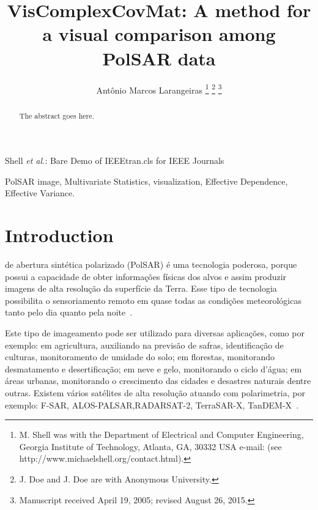 \documentclass[journal]{IEEEtran}
\begin{document}
\title{VisComplexCovMat: A method for a visual comparison among Pol{SAR} data}


\author{Ant\^onio Marcos Larangeiras
        \thanks{M. Shell was with the Department
of Electrical and Computer Engineering, Georgia Institute of Technology, Atlanta,
GA, 30332 USA e-mail: (see http://www.michaelshell.org/contact.html).}%
\thanks{J. Doe and J. Doe are with Anonymous University.}%
\thanks{Manuscript received April 19, 2005; revised August 26, 2015.}}


%
{Shell \MakeLowercase{\textit{et al.}}: Bare Demo of IEEEtran.cls for IEEE Journals}

\maketitle


\begin{abstract}
The abstract goes here.
\end{abstract}

\begin{IEEEkeywords}
PolSAR image, Multivariate Statistics, visualization, Effective Dependence, Effective Variance.
\end{IEEEkeywords}


\IEEEpeerreviewmaketitle



\section{Introduction}

 de abertura sintética polarizado (PolSAR) é uma tecnologia poderosa, porque possui a capacidade de obter informações físicas dos alvos e assim produzir imagens de alta resolução da superfície da Terra. Esse tipo de tecnologia possibilita o sensoriamento remoto em quase todas as condições meteorológicas tanto pelo dia quanto pela noite~\cite{zhang-2015,liu-2015}.

Este tipo de imageamento pode ser utilizado para diversas apli\-ca\-ções, como por exemplo: em agricultura, auxiliando na previsão de safras, identificação de culturas, monitoramento de umidade do solo; em florestas, monitorando desmatamento e desertificação; em neve e gelo, monitorando o ciclo d'água; em áreas urbanas, monitorando o crescimento das cidades e desastres naturais dentre outras. Existem vários satélites de alta resolução atuando com polarimetria, por exemplo: F-SAR, ALOS-PALSAR,RADARSAT-2, TerraSAR-X, TanDEM-X~\cite{Meneses,Lee-2009,Chen-Liu-2013,Jagdhuber-2013,Chen-Si-Wei-2013,deledalle-2015,liu-2015,usami-2016}.
\end{document}
